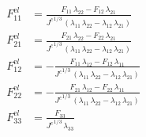 \begin{align}
F^{\mathrm el}_{11} &= \frac{F_{11}\,\lambda _{22}-F_{12}\,\lambda _{21}}{{J^{c}}^{1/3}\,\left(\lambda _{11}\,\lambda _{22}-\lambda _{12}\,\lambda _{21}\right)} \\ 
F^{\mathrm el}_{21} &= \frac{F_{21}\,\lambda _{22}-F_{22}\,\lambda _{21}}{{J^{c}}^{1/3}\,\left(\lambda _{11}\,\lambda _{22}-\lambda _{12}\,\lambda _{21}\right)} \\ 
F^{\mathrm el}_{12} &= -\frac{F_{11}\,\lambda _{12}-F_{12}\,\lambda _{11}}{{J^{c}}^{1/3}\,\left(\lambda _{11}\,\lambda _{22}-\lambda _{12}\,\lambda _{21}\right)} \\ 
F^{\mathrm el}_{22} &= -\frac{F_{21}\,\lambda _{12}-F_{22}\,\lambda _{11}}{{J^{c}}^{1/3}\,\left(\lambda _{11}\,\lambda _{22}-\lambda _{12}\,\lambda _{21}\right)} \\ 
F^{\mathrm el}_{33} &= \frac{F_{33}}{{J^{c}}^{1/3}\,\lambda _{33}} 
\end{align}
